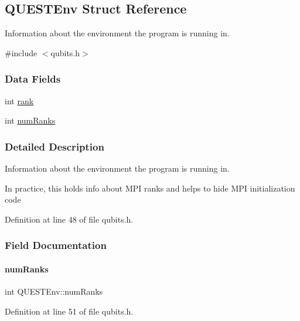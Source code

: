 \hypertarget{structQUESTEnv}{}\subsection{Q\+U\+E\+S\+T\+Env Struct Reference}
\label{structQUESTEnv}


Information about the environment the program is running in.  




{\ttfamily \#include $<$qubits.\+h$>$}

\subsubsection*{Data Fields}
\begin{DoxyCompactItemize}
\item 
int \hyperlink{structQUESTEnv_a1bdb6d425a2ce6a468f93929c0b26d73}{rank}
\item 
int \hyperlink{structQUESTEnv_ab9d9ce82e2d5f1b39aa9efc3accb3742}{num\+Ranks}
\end{DoxyCompactItemize}


\subsubsection{Detailed Description}
Information about the environment the program is running in. 

In practice, this holds info about M\+PI ranks and helps to hide M\+PI initialization code 

Definition at line 48 of file qubits.\+h.



\subsubsection{Field Documentation}
\mbox{\label{structQUESTEnv_ab9d9ce82e2d5f1b39aa9efc3accb3742}} 
\paragraph{\texorpdfstring{num\+Ranks}{numRanks}}
{\footnotesize\ttfamily int Q\+U\+E\+S\+T\+Env\+::num\+Ranks}



Definition at line 51 of file qubits.\+h.




